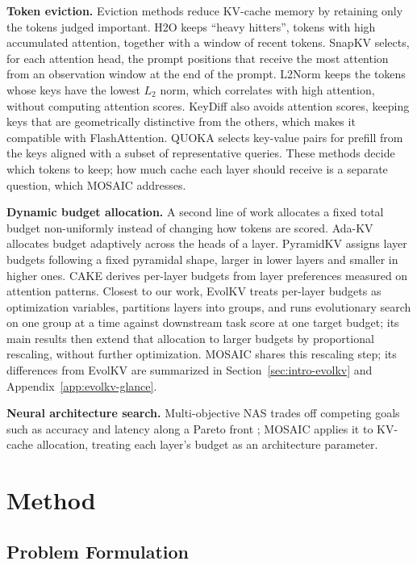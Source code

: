 \documentclass[11pt]{article}
\begin{document}
\textbf{Token eviction.} Eviction methods reduce KV-cache memory by retaining only the tokens judged important. H2O \citep{zhang2023h2o} keeps ``heavy hitters'', tokens with high accumulated attention, together with a window of recent tokens. SnapKV \citep{li2024snapkv} selects, for each attention head, the prompt positions that receive the most attention from an observation window at the end of the prompt. L2Norm \citep{devoto2024l2norm} keeps the tokens whose keys have the lowest $L_2$ norm, which correlates with high attention, without computing attention scores. KeyDiff \citep{park2025keydiff} also avoids attention scores, keeping keys that are geometrically distinctive from the others, which makes it compatible with FlashAttention. QUOKA \citep{jones2026quoka} selects key-value pairs for prefill from the keys aligned with a subset of representative queries. These methods decide which tokens to keep; how much cache each layer should receive is a separate question, which MOSAIC addresses.

\textbf{Dynamic budget allocation.} A second line of work allocates a fixed total budget non-uniformly instead of changing how tokens are scored. Ada-KV \citep{feng2025adakv} allocates budget adaptively across the heads of a layer. PyramidKV \citep{cai2025pyramidkv} assigns layer budgets following a fixed pyramidal shape, larger in lower layers and smaller in higher ones. CAKE \citep{qin2025cake} derives per-layer budgets from layer preferences measured on attention patterns. Closest to our work, EvolKV \citep{yu2025evolkv} treats per-layer budgets as optimization variables, partitions layers into groups, and runs evolutionary search on one group at a time against downstream task score at one target budget; its main results then extend that allocation to larger budgets by proportional rescaling, without further optimization. MOSAIC shares this rescaling step; its differences from EvolKV are summarized in Section~\ref{sec:intro-evolkv} and Appendix~\ref{app:evolkv-glance}.

\textbf{Neural architecture search.} Multi-objective NAS trades off competing goals such as accuracy and latency along a Pareto front \citep{elsken2018neural}; MOSAIC applies it to KV-cache allocation, treating each layer's budget as an architecture parameter.

\section{Method}

\subsection{Problem Formulation}
\end{document}
